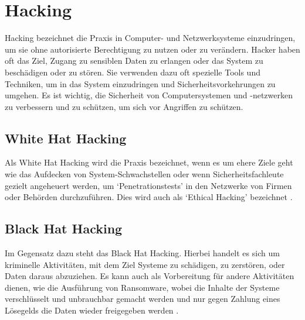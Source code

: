 \documentclass[12pt, a4paper, onecolumn, oneside, toc=bibliographynumbered, liststotoc]{scrreprt} %
\begin{document}
		\section{Hacking}
            Hacking bezeichnet die Praxis in Computer- und Netzwerksysteme einzudringen, um sie ohne autorisierte Berechtigung zu nutzen oder zu verändern. Hacker haben oft das Ziel, Zugang zu sensiblen Daten zu erlangen oder das System zu beschädigen oder zu stören. Sie verwenden dazu oft spezielle Tools und Techniken, um in das System einzudringen und Sicherheitsvorkehrungen zu umgehen. Es ist wichtig, die Sicherheit von Computersystemen und -netzwerken zu verbessern und zu schützen, um sich vor Angriffen zu schützen.
			\subsection{White Hat Hacking}
                Als White Hat Hacking wird die Praxis bezeichnet, wenn es um ehere Ziele geht wie das Aufdecken von System-Schwachstellen oder wenn Sicherheitsfachleute gezielt angeheuert werden, um \enquote*{Penetrationstests} in den Netzwerke von Firmen oder Behörden durchzuführen. Dies wird auch als \enquote*{Ethical Hacking} bezeichnet \parencite[134\psq]{Sinha.2020}.
                
    
			\subsection{Black Hat Hacking}
                Im Gegensatz dazu steht das Black Hat Hacking. Hierbei handelt es sich um kriminelle Aktivitäten, mit dem Ziel Systeme zu schädigen, zu zerstören, oder Daten daraus abzuziehen. Es kann auch als Vorbereitung für andere Aktivitäten dienen, wie die Ausführung von Ransomware, wobei die Inhalte der Systeme verschlüsselt und unbrauchbar gemacht werden und nur gegen Zahlung eines Lösegelds die Daten wieder freigegeben werden \parencite[134\psq]{Sinha.2020}. 
                

        
                
\end{document}
